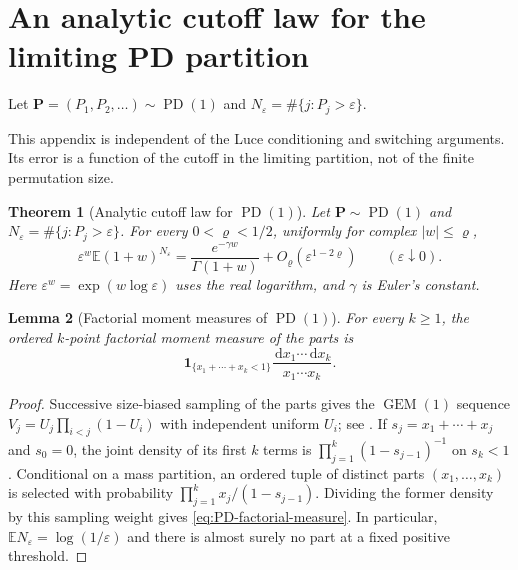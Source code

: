 \documentclass[11pt]{article}
\numberwithin{equation}{section}
\newcommand{\E}{\mathbb E}
\newcommand{\PD}{\operatorname{PD}}
\newcommand{\GEM}{\operatorname{GEM}}
\newcommand{\one}{\mathbf 1}
\newcommand{\dd}{\,\mathrm d}
\newcommand{\eps}{\varepsilon}
\newtheorem{theorem}{Theorem}[section]
\newtheorem{lemma}[theorem]{Lemma}
\theoremstyle{definition}
\theoremstyle{remark}
\begin{document}
\appendix
\section{An analytic cutoff law for the limiting PD partition}\label{sec:PD-cumulants}

Let $\mathbf P=(P_1,P_2,\ldots)\sim\PD(1)$ and
$N_\eps=\#\{j:P_j>\eps\}$.

This appendix is independent of the Luce conditioning and switching
arguments.  Its error is a function of the cutoff in the limiting
partition, not of the finite permutation size.

\begin{theorem}[Analytic cutoff law for $\PD(1)$]\label{thm:PD-analytic}
Let $\mathbf P\sim\PD(1)$ and
$N_\varepsilon=\#\{j:P_j>\varepsilon\}$.
For every $0<\varrho<1/2$, uniformly for complex $|w|\le\varrho$,
\begin{equation}\label{eq:PD-analytic}
 \varepsilon^w\E(1+w)^{N_\varepsilon}
 =\frac{e^{-\gamma w}}{\Gamma(1+w)}
   +O_\varrho(\varepsilon^{1-2\varrho})
 \qquad(\varepsilon\downarrow0).
\end{equation}
Here $\varepsilon^w=\exp(w\log\varepsilon)$ uses the real logarithm,
and $\gamma$ is Euler's constant.
\end{theorem}

\begin{lemma}[Factorial moment measures of $\PD(1)$]
\label{lem:PD-factorial-measure}
For every $k\ge1$, the ordered $k$-point factorial moment measure of the
parts is
\begin{equation}\label{eq:PD-factorial-measure}
 \one_{\{x_1+\cdots+x_k<1\}}
 \frac{\dd x_1\cdots\dd x_k}{x_1\cdots x_k}.
\end{equation}
\end{lemma}
\begin{proof}
Successive size-biased sampling of the parts gives the $\GEM(1)$ sequence
$V_j=U_j\prod_{i<j}(1-U_i)$ with independent uniform $U_i$; see
\cite[Chapter~3]{Pitman2006}.  If $s_j=x_1+\cdots+x_j$ and $s_0=0$, the
joint density of its first $k$ terms is
$\prod_{j=1}^k(1-s_{j-1})^{-1}$ on $s_k<1$.
Conditional on a mass partition, an ordered tuple of distinct parts
$(x_1,\ldots,x_k)$ is selected with probability
$\prod_{j=1}^k x_j/(1-s_{j-1})$.
Dividing the former density by this sampling weight gives
\eqref{eq:PD-factorial-measure}.  In particular,
$\E N_\eps=\log(1/\eps)$ and there is almost surely no part at a fixed
positive threshold.
\end{proof}
\end{document}
